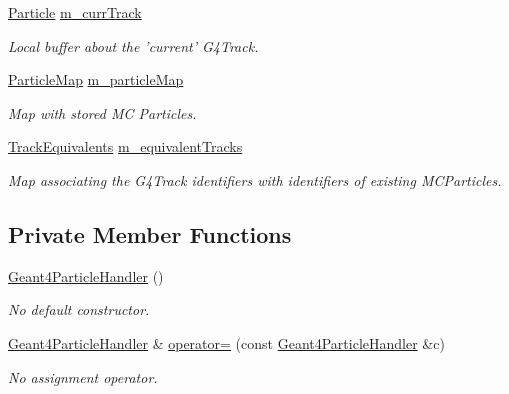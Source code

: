 \begin{DoxyCompactItemize}
\hyperlink{class_d_d4hep_1_1_simulation_1_1_geant4_particle}{Particle} \hyperlink{class_d_d4hep_1_1_simulation_1_1_geant4_particle_handler_a4b3c0241a36842b2a6048a3e572e9c48}{m\_\-currTrack}
\begin{DoxyCompactList}\small\item\em Local buffer about the 'current' G4Track. \item\end{DoxyCompactList}\item 
\hyperlink{class_d_d4hep_1_1_simulation_1_1_geant4_particle_handler_a79cf5fe4ceb492dff4d3458306a08973}{ParticleMap} \hyperlink{class_d_d4hep_1_1_simulation_1_1_geant4_particle_handler_a9f1973d25638be1fbfad9166a681d765}{m\_\-particleMap}
\begin{DoxyCompactList}\small\item\em Map with stored MC Particles. \item\end{DoxyCompactList}\item 
\hyperlink{class_d_d4hep_1_1_simulation_1_1_geant4_particle_handler_a6163ec58bca837bb4544fd6e2f4bc05a}{TrackEquivalents} \hyperlink{class_d_d4hep_1_1_simulation_1_1_geant4_particle_handler_a5978fee684baca7e2e04931783440122}{m\_\-equivalentTracks}
\begin{DoxyCompactList}\small\item\em Map associating the G4Track identifiers with identifiers of existing MCParticles. \item\end{DoxyCompactList}\end{DoxyCompactItemize}
\subsection*{Private Member Functions}
\begin{DoxyCompactItemize}
\item 
\hyperlink{class_d_d4hep_1_1_simulation_1_1_geant4_particle_handler_a0de98b6650d1787bf26b6b959bc7e502}{Geant4ParticleHandler} ()
\begin{DoxyCompactList}\small\item\em No default constructor. \item\end{DoxyCompactList}\item 
\hyperlink{class_d_d4hep_1_1_simulation_1_1_geant4_particle_handler}{Geant4ParticleHandler} \& \hyperlink{class_d_d4hep_1_1_simulation_1_1_geant4_particle_handler_a880488dc828d7e3a38a4332347608fc2}{operator=} (const \hyperlink{class_d_d4hep_1_1_simulation_1_1_geant4_particle_handler}{Geant4ParticleHandler} \&c)
\begin{DoxyCompactList}\small\item\em No assignment operator. \item\end{DoxyCompactList}\end{DoxyCompactItemize}


